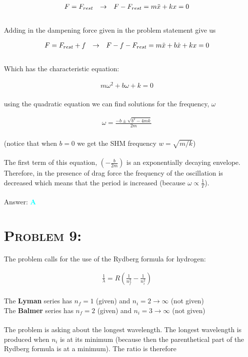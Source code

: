 \documentclass{article}
\begin{document}
\begin{gather}
F = F_{rest} \hspace{.1in} \rightarrow \hspace{.1in} F - F_{rest} = m\ddot{x} + kx = 0
\end{gather}
\\
Adding in the dampening force given in the problem statement give us

\begin{gather}
F = F_{rest} + f \hspace{.1in} \rightarrow \hspace{.1in} F - f - F_{rest}  = m\ddot{x} + b\dot{x} + kx = 0
\end{gather}
\\
Which has the characteristic equation:

\begin{gather}
 m\omega^{2}+ b\omega + k = 0\nonumber
\end{gather}
\\
using the quadratic equation we can find solutions for the frequency, $\omega$

\begin{gather}
\omega = \frac{-b \pm \sqrt{b^{2}-4mk}}{2m}\nonumber
\end{gather}
\\
(notice that when $b = 0$ we get the SHM frequency $w = \sqrt{m/k}$)\\\\ The first term of this equation, $\left(  -\frac{b}{2m}  \right)$ is an exponentially decaying envelope. Therefore, in the presence of drag force the frequency of the oscillation is decreased which means that the period is increased (because $\omega \propto \frac{1}{T}$).
\\\\
Answer: \textbf{\textcolor{cyan}A}\\


\section{\textsc{Problem 9:}} The problem calls for the use of the Rydberg formula for hydrogen:

\begin{gather}
\frac{1}{\lambda} = R \left(  \frac{1}{n_{f}^{2}} - \frac{1}{n_{i}^{2}}  \right)
\end{gather}
\\
The \textbf{Lyman} series has $n_{f} = 1$ (given) and $n_{i} = 2  \rightarrow \infty$ (not given)\\
The \textbf{Balmer} series has $n_{f} = 2$ (given) and $n_{i} = 3  \rightarrow \infty$ (not given)\\
\\
The problem is asking about the longest wavelength. The longest wavelength is produced when $n_{i}$ is at its minimum (because then the parenthetical part of the Rydberg formula is at a minimum). The ratio is therefore
\end{document}
